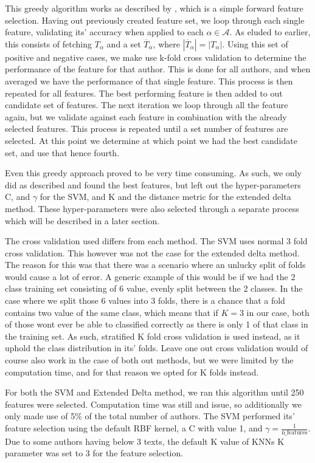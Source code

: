This greedy algorithm works as described by \cite{kanDeng}, which is a simple
forward feature selection. Having out previously created feature set, we loop
through each single feature, validating its' accuracy when applied to each
$\alpha \in \mathcal{A}$. As eluded to earlier, this consists of fetching
$T_{\alpha}$ and a set $\overline{T}_{\alpha}$, where $|\overline{T}_\alpha| =
|T_\alpha|$. Using this set of positive and negative cases, we make use k-fold
cross validation to determine the performance of the feature for that author.
This is done for all authors, and when averaged we have the performance of
that single feature. This process is then repeated for all features. The best
performing feature is then added to out candidate set of features. The next
iteration we loop through all the feature again, but we validate against each
feature in combination with the already selected features. This process is
repeated until a set number of features are selected. At this point we determine
at which point we had the best candidate set, and use that hence fourth.

Even this greedy approach proved to be very time consuming. As such, we only did
as described and found the best features, but left out the hyper-parameters C,
and $\gamma$ for the SVM, and K and the distance metric for the extended delta
method. These hyper-parameters were also selected through a separate process
which will be described in a later section.

The cross validation used differs from each method. The SVM uses normal 3 fold
cross validation. This however was not the case for the extended delta method.
The reason for this was that there was a scenario where an unlucky split of
folds would cause a lot of error. A generic example of this would be if we
had the 2 class training set consisting of 6 value, evenly split between the
2 classes. In the case where we split those 6 values into 3 folds, there is a
chance that a fold contains two value of the same class, which means that if $K
= 3$ in our case, both of those wont ever be able to classified correctly as
there is only 1 of that class in the training set. As such, stratified K fold
cross validation is used instead, as it uphold the class distribution in its'
folds. Leave one out cross validation would of course also work in the case of
both out methods, but we were limited by the computation time, and for that
reason we opted for K folds instead.

For both the \gls{SVM} and Extended Delta method, we ran this algorithm
until 250 features were selected. Computation time was still and issue, so
additionally we only made use of 5\% of the total number of authors. The SVM
performed its' feature selection using the default RBF kernel, a C with value 1,
and $\gamma = \frac{1}{\text{n\_features}}$. Due to some authors having below
3 texts, the default K value of \gls{KNN}s K parameter was set to 3 for the
feature selection.

